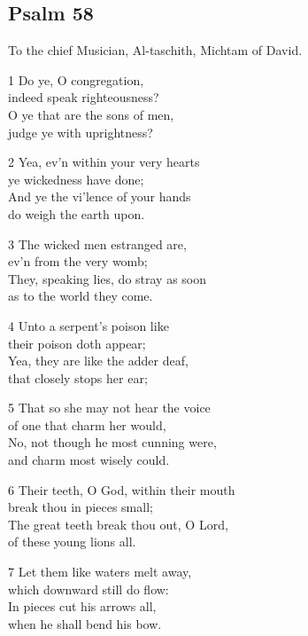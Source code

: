 \begin{multicols}{3}
\begin{center}
\quad{}\quad{}
\end{center}

\subsection*{Psalm 58}

To the chief Musician, Al-taschith, Michtam of David.

1 Do ye, O congregation,\\
indeed speak righteousness?\\
O ye that are the sons of men,\\
judge ye with uprightness?

2 Yea, ev’n within your very hearts\\
ye wickedness have done;\\
And ye the vi’lence of your hands\\
do weigh the earth upon.

3 The wicked men estranged are,\\
ev’n from the very womb;\\
They, speaking lies, do stray as soon\\
as to the world they come.

4 Unto a serpent’s poison like\\
their poison doth appear;\\
Yea, they are like the adder deaf,\\
that closely stops her ear;

5 That so she may not hear the voice\\
of one that charm her would,\\
No, not though he most cunning were,\\
and charm most wisely could.

6 Their teeth, O God, within their mouth\\
break thou in pieces small;\\
The great teeth break thou out, O Lord,\\
of these young lions all.

7 Let them like waters melt away,\\
which downward still do flow:\\
In pieces cut his arrows all,\\
when he shall bend his bow.


\end{multicols}
